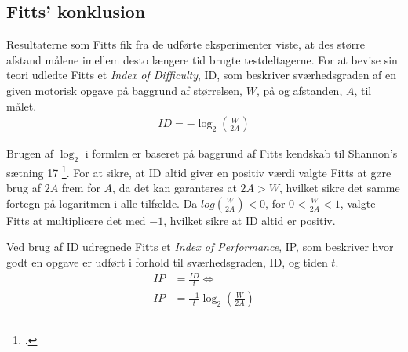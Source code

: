 \subsection*{Fitts' konklusion}
Resultaterne som Fitts fik fra de udførte eksperimenter viste, at des større afstand målene imellem desto længere tid brugte testdeltagerne. For at bevise sin teori udledte Fitts et \textit{Index of Difficulty}, ID, som beskriver sværhedsgraden af en given motorisk opgave på baggrund af størrelsen, $W$, på og afstanden, $A$, til målet.
\begin{align*}
ID = -\log_2\left(\frac{W}{2A}\right)
\end{align*}

Brugen af $\log_2$ i formlen er baseret på baggrund af Fitts kendskab til Shannon's sætning 17 \footcite{goldberg2015}. For at sikre, at ID altid giver en positiv værdi valgte Fitts at gøre brug af $2A$ frem for $A$, da det kan garanteres at $2A > W$, hvilket sikre det samme fortegn på logaritmen i alle tilfælde. Da $log\left(\frac{W}{2A}\right)<0$, for $0<\frac{W}{2A}<1$, valgte Fitts at multiplicere det med $-1$, hvilket sikre at ID altid er positiv.

Ved brug af ID udregnede Fitts et \textit{Index of Performance}, IP, som beskriver hvor godt en opgave er udført i forhold til sværhedsgraden, ID, og tiden $t$.
\begin{align*}
IP &= \frac{ID}{t}\Leftrightarrow\\
IP &= \frac{-1}{t}\log_2\left(\frac{W}{2A}\right)
\end{align*}

